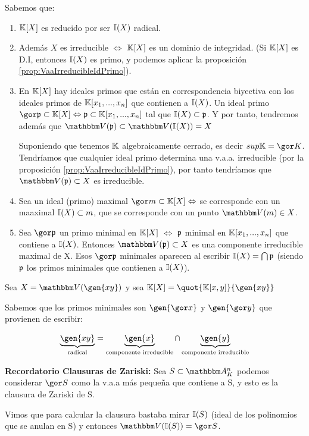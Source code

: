 Sabemos que:
\begin{enumerate}
	\item $\mathbb{K}[X]$ es reducido por ser $\mathbb{I}(X)$ radical.
	\item Además $X$ es irreducible $\Leftrightarrow$ $\mathbb{K}[X]$ es un dominio de integridad. (Si $\mathbb{K}[X]$ es D.I, entonces $\mathbb{I}(X)$ es primo, y podemos aplicar la proposición \ref{prop:VaaIrreducibleIdPrimo}).
	\item En $\mathbb{K}[X]$ hay ideales primos que están en correspondencia biyectiva con los ideales primos de $\mathbb{K}[x_1,...,x_n]$ que contienen a $\mathbb{I}(X)$. Un ideal primo $\cls{\pideal} \subset \K[X] \Leftrightarrow \pideal \subset \K[x_1,...,x_n]$ tal que $\mathbb{I}(X) \subset \mathfrak{p}$. Y por tanto, tendremos además que  $\V(\pideal) \subset \V(\I(X))=X$

	Suponiendo que tenemos $\mathbb{K}$ algebraicamente cerrado, es decir $sup \K= \cls{K}$. Tendríamos que cualquier ideal primo determina una v.a.a. irreducible (por la proposición \ref{prop:VaaIrreducibleIdPrimo}), por tanto tendríamos que $\V(\pideal)\subset X$ es irreducible.
	\item Sea un ideal (primo) maximal $\cls{m}  \subset \K[X] \Leftrightarrow$ se corresponde con un maaximal $\mathbb{I}(X) \subset m$, que se corresponde con un punto $\V(m) \in X$.
	\item Sea $\cls{\pideal}$ un primo minimal en $\mathbb{K}[X]$ $\Leftrightarrow$ $\mathfrak{p}$ minimal en $\mathbb{K}[x_1,...,x_n]$ que contiene a $\mathbb{I}(X)$. Entonces $\V(\pideal) \subset X$ es una componente irreducible maximal de X. Esos $\cls{\pideal}$ minimales aparecen al escribir $\mathbb{I}(X)= \bigcap \mathfrak{p}$ (siendo $\mathfrak{p}$ los primos minimales que contienen a $\mathbb{I}(X)$).
\end{enumerate}

\begin{example}
	Sea $X=\V(\gen{xy})$ y sea $\K[X]=\quot{\K[x,y]}{\gen{xy}}$

	Sabemos que los primos minimales son $\gen{\cls{x}}$ y $\gen{\cls{y}}$ que provienen de escribir:

	$$ \underbrace{\gen{xy}}_{\text{radical}} = \underbrace{\gen{x}}_{\text{componente irreducible}} \cap \underbrace{\gen{y}}_{\text{componente irreducible}}$$
\end{example}

\textbf{Recordatorio Clausuras de Zariski:} Sea $S \subset \Akn$ podemos considerar $\cls{S}$ como la v.a.a más pequeña que contiene a S, y esto es la clausura de Zariski de S.

Vimos que para calcular la clausura bastaba mirar $\mathbb{I}(S)$  (ideal de los polinomios que se anulan en S) y entonces $\V(\I(S))=\cls{S}$.

